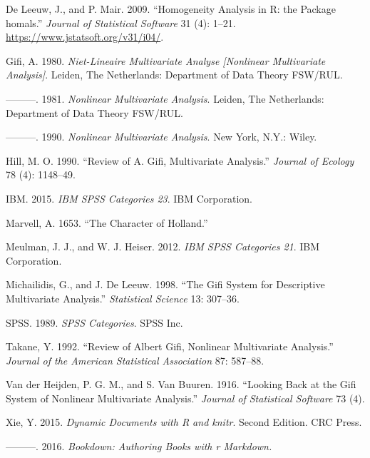 \documentclass[
  12pt,
  letterpaper,
  DIV=11,
  numbers=noendperiod]{scrreprt}
\newlength{\cslhangindent}
\newenvironment{CSLReferences}[2] %
 {\begin{list}{}{%
  \setlength{\itemindent}{0pt}
  \setlength{\leftmargin}{0pt}
  \setlength{\parsep}{0pt}
  \ifodd #1
   \setlength{\leftmargin}{\cslhangindent}
   \setlength{\itemindent}{-1\cslhangindent}
  \fi
  \setlength{\itemsep}{#2\baselineskip}}}
 {\end{list}}
\begin{document}
\label{refs}
\begin{CSLReferences}{1}{0}
De Leeuw, J., and P. Mair. 2009. {``{Homogeneity Analysis in {R}: the
Package homals}.''} \emph{Journal of Statistical Software} 31 (4):
1--21. \url{https://www.jstatsoft.org/v31/i04/}.

Gifi, A. 1980. \emph{Niet-Lineaire Multivariate Analyse {[}Nonlinear
Multivariate Analysis{]}}. Leiden, The Netherlands: Department of Data
Theory FSW/RUL.

---------. 1981. \emph{Nonlinear Multivariate Analysis}. Leiden, The
Netherlands: Department of Data Theory FSW/RUL.

---------. 1990. \emph{Nonlinear Multivariate Analysis}. New York, N.Y.:
Wiley.

Hill, M. O. 1990. {``{Review of A. Gifi, Multivariate Analysis}.''}
\emph{Journal of Ecology} 78 (4): 1148--49.

IBM. 2015. \emph{IBM SPSS Categories 23}. IBM Corporation.

Marvell, A. 1653. {``The Character of Holland.''}

Meulman, J. J., and W. J. Heiser. 2012. \emph{IBM SPSS Categories 21}.
IBM Corporation.

Michailidis, G., and J. De Leeuw. 1998. {``The Gifi System for
Descriptive Multivariate Analysis.''} \emph{Statistical Science} 13:
307--36.

SPSS. 1989. \emph{SPSS Categories}. SPSS Inc.

Takane, Y. 1992. {``{Review of Albert Gifi, Nonlinear Multivariate
Analysis}.''} \emph{Journal of the American Statistical Association} 87:
587--88.

Van der Heijden, P. G. M., and S. Van Buuren. 1916. {``Looking Back at
the Gifi System of Nonlinear Multivariate Analysis.''} \emph{Journal of
Statistical Software} 73 (4).

Xie, Y. 2015. \emph{{Dynamic Documents with R and knitr}}. Second
Edition. CRC Press.

---------. 2016. \emph{Bookdown: Authoring Books with r Markdown.}

\end{CSLReferences}
\end{document}
